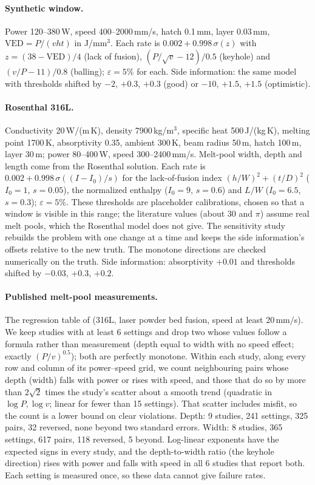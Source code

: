 \documentclass{article}
\newcommand{\eps}{\varepsilon}
\begin{document}
\paragraph{Synthetic window.} Power 120--380\,W, speed 400--2000\,mm/s,
hatch 0.1\,mm, layer 0.03\,mm, $\mathrm{VED}=P/(vht)$ in J/mm$^3$. Each
rate is $0.002+0.998\,\sigma(z)$ with $z=(38-\mathrm{VED})/4$ (lack of
fusion), $(P/\sqrt v-12)/0.5$ (keyhole) and $(v/P-11)/0.8$ (balling);
$\eps=5\%$ for each. Side information: the same model with thresholds
shifted by $-2$, $+0.3$, $+0.3$ (good) or $-10$, $+1.5$, $+1.5$
(optimistic).

\paragraph{Rosenthal 316L.} Conductivity 20\,W/(m\,K), density
7900\,kg/m$^3$, specific heat 500\,J/(kg\,K), melting point 1700\,K,
absorptivity 0.35, ambient 300\,K, beam radius 50\,\textmu m, hatch
100\,\textmu m, layer 30\,\textmu m; power 80--400\,W, speed
300--2400\,mm/s. Melt-pool width, depth and length come from the
Rosenthal solution. Each rate is $0.002+0.998\,\sigma((I-I_0)/s)$ for the
lack-of-fusion index $(h/W)^2+(t/D)^2$ ($I_0=1$, $s=0.05$), the
normalized enthalpy ($I_0=9$, $s=0.6$) and $L/W$ ($I_0=6.5$, $s=0.3$);
$\eps=5\%$. These thresholds are placeholder calibrations, chosen so
that a window is visible in this range; the literature values (about 30
and $\pi$) assume real melt pools, which the Rosenthal model does not
give. The sensitivity study rebuilds the problem with one change at a
time and keeps the side information's offsets relative to the new truth. The monotone directions are checked numerically on the truth.
Side information: absorptivity $+0.01$ and thresholds shifted by $-0.03$,
$+0.3$, $+0.2$.

\paragraph{Published melt-pool measurements.} The regression table of
\citet{akbari2022meltpoolnet} (316L, laser powder bed fusion, speed at
least 20\,mm/s). We keep studies with at least 6 settings and drop two
whose values follow a formula rather than measurement (depth equal to
width with no speed effect; exactly $(P/v)^{0.5}$); both are perfectly
monotone. Within each study, along every row and column of its
power--speed grid, we count neighbouring pairs whose depth (width) falls
with power or rises with speed, and those that do so by more than
$2\sqrt2$ times the study's scatter about a smooth trend (quadratic in
$\log P,\log v$; linear for fewer than 15 settings). That scatter
includes misfit, so the count is a lower bound on clear violations.
Depth: 9 studies, 241 settings, 325 pairs, 32 reversed, none beyond two
standard errors. Width: 8 studies, 365 settings, 617 pairs, 118 reversed,
5 beyond. Log-linear exponents have the expected signs in every study,
and the depth-to-width ratio (the keyhole direction) rises with power and
falls with speed in all 6 studies that report both. Each setting is
measured once, so these data cannot give failure rates.
\end{document}
